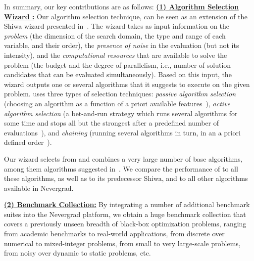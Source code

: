 
In summary, our key contributions are as follows: 
\underline{\textbf{(1) Algorithm Selection Wizard \ngoptq{}:}} Our algorithm selection technique, \ngoptq{} can be seen as an extension of the Shiwa wizard presented in~\cite{versatile}. 
The wizard takes as input information on the \emph{problem} (the dimension of the search domain, the type and range of each variable, and their order), the \emph{presence of noise} in the evaluation (but not its intensity), and the \emph{computational resources} that are available to solve the problem (the budget and the degree of parallelism, i.e., number of solution candidates that can be evaluated simultaneously). Based on this input, the wizard outputs one or several algorithms that it suggests to execute on the given problem. 
\ngoptq{} uses three types of selection techniques: 
\emph{passive algorithm selection} (choosing an algorithm as a function of a priori available features~\cite{versatile}), 
\emph{active algorithm selection} (a bet-and-run strategy which runs several algorithms for some time and stops all but the strongest {after a predefined number of evaluations}~\cite{mersmann2011,pitzer2012,FischettiM14,malan2013,munoz2015_as,cauwet2016algorithm,kerschke2018survey}), %
and \emph{chaining} (running several algorithms in turn, in an a priori defined order~\cite{chaining}). 

Our wizard selects from and combines a very large number of base algorithms, among them algorithms suggested in~\cite{scipy,cma,de,powell,cobyla,versatile,beyerhellwignoise,artelyssqp2,fastga,adaptivecarola}. We compare the performance of \ngoptq{} to all these algorithms, as well as to its predecessor Shiwa, and to all other algorithms available in Nevergrad. 

\underline{\textbf{(2) Benchmark Collection:}} By integrating a number of additional benchmark suites into the Nevergrad platform, we obtain a huge benchmark collection that covers a previously unseen breadth of black-box optimization problems, ranging from academic benchmarks to real-world applications, from discrete over numerical to mixed-integer problems, from small to very large-scale problems, from noisy over dynamic to static problems, etc. 

